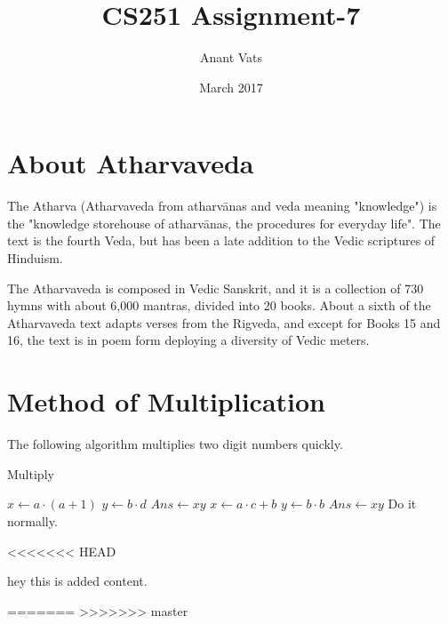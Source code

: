 \documentclass{article}
\title{CS251 Assignment-7}
\author{Anant Vats }
\date{March 2017}
\begin{document}
\maketitle
\section{About Atharvaveda}
The Atharva (Atharvaveda from atharvānas and veda meaning "knowledge") is the "knowledge storehouse of atharvānas, the procedures for everyday life". The text is the fourth Veda, but has been a late addition to the Vedic scriptures of Hinduism.\cite{wikicite1}

The Atharvaveda is composed in Vedic Sanskrit, and it is a collection of 730 hymns with about 6,000 mantras, divided into 20 books. About a sixth of the Atharvaveda text adapts verses from the Rigveda, and except for Books 15 and 16, the text is in poem form deploying a diversity of Vedic meters.\cite{wikicite1} 

\section{Method of Multiplication}
The following algorithm multiplies two digit numbers quickly.
\begin{algorithm}
\caption{Multiply}\label{Merge}
\begin{algorithmic}[1]
  
\State $x\gets a\cdot (a+1)$
\State $y\gets b\cdot d$
\State $Ans\gets xy$
\EndIf
{} 
\State $x\gets a\cdot c+b$
\State$y\gets b\cdot b$
\State$Ans\gets xy$
\Else
\State Do it normally.
\EndIf
\EndProcedure
\Statex

\end{algorithmic}
\end{algorithm}

<<<<<<< HEAD

hey this is added content.


=======
>>>>>>> master
\end{document}
